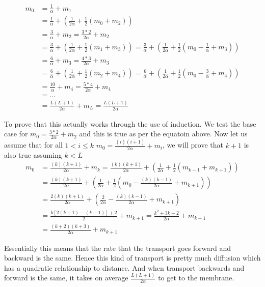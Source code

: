 \documentclass{article}
\begin{document}
\begin{align}
m_{0} &= \frac{1}{\alpha} + m_{1}\\
&= \frac{1}{\alpha} + \left(\frac{1}{2\alpha} + \frac{1}{2}(m_{0} + m_{2})\right)\\
&= \frac{3}{\alpha} + m_{2}= \frac{3*2}{2\alpha} + m_{2}\\
&= \frac{3}{\alpha} + \left(\frac{1}{2\alpha} + \frac{1}{2}(m_{1} + m_{3})\right) = \frac{3}{\alpha} + \left(\frac{1}{2\alpha} + \frac{1}{2}(m_{0} - \frac{1}{\alpha} + m_{3})\right)\\
&= \frac{6}{\alpha} + m_{3}= \frac{4*3}{2\alpha} + m_{3}\\
&=\frac{6}{\alpha} + \left(\frac{1}{2\alpha} + \frac{1}{2}(m_{2} + m_{4})\right) = \frac{6}{\alpha} + \left(\frac{1}{2\alpha} + \frac{1}{2}(m_{0} - \frac{3}{\alpha} + m_{4})\right)\\
&= \frac{10}{\alpha} + m_{4} = \frac{5*4}{2\alpha} + m_{4}\\
&=...\\
&= \frac{L(L+1)}{2\alpha} + m_{L} = \frac{L(L+1)}{2\alpha}
\end{align}

To prove that this actually works through the use of induction.
We test the base case for $m_{0} = \frac{3*2}{2\alpha} + m_{2}$ and this is true
as per the equatoin above. Now let us assume that for all $ 1 < i\leq k$
$m_{0} = \frac{(i)(i+1)}{2\alpha} + m_{i}$, we will prove that $k+1$ is also true assuming
$k < L$
\begin{align}
m_{0} &= \frac{(k)(k+1)}{2\alpha} + m_{k} =\frac{(k)(k+1)}{2\alpha} + \left(\frac{1}{2\alpha} + \frac{1}{2}(m_{k-1} + m_{k+1})\right)\\
&= \frac{(k)(k+1)}{2\alpha} + \left(\frac{1}{2\alpha} + \frac{1}{2}(m_{0}-\frac{(k)(k-1)}{2\alpha} + m_{k+1})\right)\\
&= \frac{2(k)(k+1)}{2\alpha} + \left(\frac{2}{2\alpha} -\frac{(k)(k-1)}{2\alpha} + m_{k+1}\right)\\
&= \frac{k[2(k+1) - (k-1)]+2}{2} + m_{k+1} = \frac{k^{2}+3k+2}{2\alpha} + m_{k+1}\\
&= \frac{(k+2)(k+3)}{2\alpha}+ m_{k+1}
\end{align}

Essentially this means that the rate that the transport goes forward and backward is
the same. Hence this kind of transport is pretty much diffusion which has a quadratic relationship to distance.
And when transport backwards and forward is the same, it takes on average
$\frac{L(L+1)}{2\alpha}$ to get to the membrane.
\end{document}
